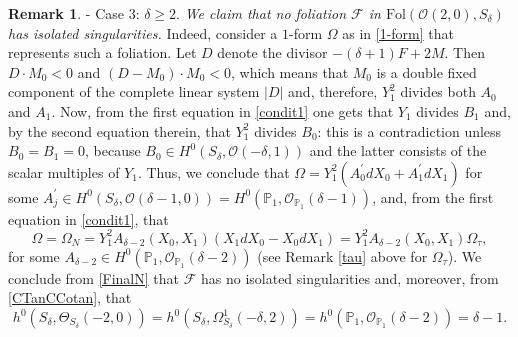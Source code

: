 \documentclass{amsart} %
\theoremstyle{definition}
\newtheorem{remark}[theorem]{Remark}
\newcommand{\cs}{S_{\delta}}
\newcommand{\PP}{\mathbb{P}}
\newcommand{\mcO}{\mathcal{O}}
\begin{document}
\begin{remark}
- Case 3: $\delta \geq 2 $. {\it We claim that no
  foliation
  $\mathcal F$ in $\mathrm{Fol}(\mcO(2,0), S_{\delta})$ has
  isolated singularities.} Indeed, consider a
  $1$-form $ \Omega $ as in \eqref{1-form} that represents such a foliation.
  Let $D$ denote the divisor
  $-(\delta+1)F + 2M $. Then  $ D\cdot M_0 < 0 $ and
  $ (D-M_0)\cdot M_0 < 0 $, which means that $M_0$ is a double fixed component of the complete
  linear system $ |D| $ and, therefore, $ Y_1^2 $ divides both $ A_0 $ and $ A_1 $. Now, from the first equation in \eqref{condit1} one gets that $ Y_1 $ divides $ B_1 $ and,
  by the second equation therein, that $Y_1^2$ divides $B_0$: this is a contradiction unless
  $ B_0 = B_1 = 0 $, because $ B_0 \in H^0( S_{\delta}, \mcO(-\delta,1) )$ and the latter consists of the
  scalar multiples of $Y_1$. Thus, we conclude that
  $ \Omega = Y_1^2 ( A_0^{\prime} dX_0 + A_1^{\prime} dX_1 ) $ for some
  $ A_j^{\prime} \in H^0( S_{\delta}, \mcO(\delta-1,0) ) = H^0( \PP_1, \mcO_{\PP_1}(\delta-1) ) $,
  and, from the first equation in \eqref{condit1}, that
  \begin{equation}\label{FinalN}
    \Omega =
    \Omega_N =
    Y_1^2 A_{\delta-2}(X_0, X_1)  ( X_1 dX_0 - X_0 dX_1 ) = Y_1^2 A_{\delta-2}(X_0, X_1)
     \Omega_{\tau},
  \end{equation}
  for some $ A_{\delta-2} \in H^0( \PP_1, \mcO_{\PP_1}(\delta-2) ) $ (see Remark \ref{tau} above for
  $ \Omega_{\tau}$). We conclude from \eqref{FinalN} that ${\mathcal F}$ has no isolated singularities
  and, moreover, from \eqref{CTanCCotan}, that
  $$ h^0( \cs, \Theta_{\cs}(-2,0) ) =
    h^0( \cs, \Omega_{\cs}^1(-\delta, 2) ) =
    h^0( \PP_1, \mcO_{\PP_1}(\delta-2) ) = \delta - 1.$$
\end{remark}
\end{document}
